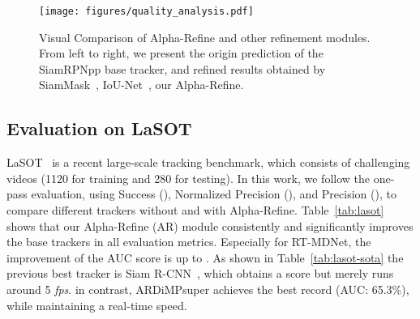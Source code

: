 \documentclass[final]{cvpr}
\begin{document}
\begin{figure}[!h]
\centering
    \texttt{[image: figures/quality\_analysis.pdf]}
\caption{Visual Comparison of Alpha-Refine and other refinement modules. From left to right, we present the origin prediction of the SiamRPNpp base tracker, and refined results obtained by SiamMask~\cite{SiamMask}, IoU-Net~\cite{ATOM,DiMP}, our Alpha-Refine.} \label{fig:visual}
    \vspace{-4mm}
\end{figure} 


\subsection{Evaluation on LaSOT}
\label{sec_lasot}
LaSOT~\cite{LaSOT} is a recent large-scale tracking benchmark, 
which consists of  challenging videos (1120 for training and 280 for testing). 
In this work, we follow the one-pass evaluation, using Success (), Normalized Precision 
(), and Precision (), to compare different trackers without and with Alpha-Refine. 
Table~\ref{tab:lasot} shows that our Alpha-Refine (AR) module consistently and significantly 
improves the base trackers in all evaluation metrics. 
Especially for RT-MDNet, the improvement of the AUC score is up to .
As shown in Table~\ref{tab:lasot-sota} the previous best tracker is Siam R-CNN~\cite{SiamRCNN}, which obtains a  
 score but merely runs around 5 \emph{fps}. 
in contrast, ARDiMPsuper achieves the best record (\rm{AUC}: 65.3\%), while maintaining a real-time speed. 
\end{document}
